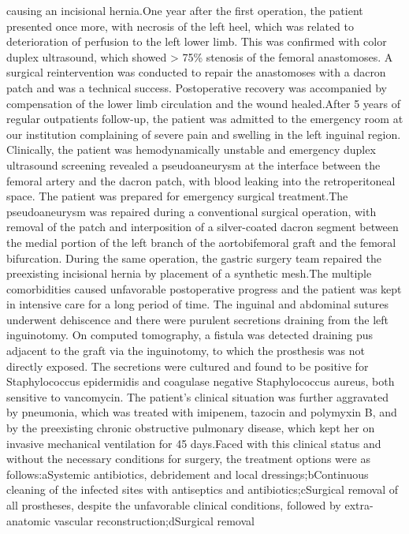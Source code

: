 \documentclass[numberinsection,times,10pt,spreadimages]{memoir}
\begin{document}
causing an incisional hernia.One year after the first operation, the patient
presented once more, with
necrosis of the left heel, which was related to deterioration of perfusion to
the left lower limb. This was confirmed with color duplex ultrasound, which
showed > 75\% stenosis of the femoral anastomoses. A surgical reintervention
was conducted to repair the anastomoses with a dacron patch and was a technical
success. Postoperative recovery was accompanied by compensation of the lower
limb circulation and the wound healed.After 5 years of regular outpatients
follow-up, the patient was admitted to the
emergency room at our institution complaining of severe pain and swelling in the
left inguinal region. Clinically, the patient was hemodynamically unstable and
emergency duplex ultrasound screening revealed a pseudoaneurysm at the interface
between the femoral artery and the dacron patch, with blood leaking into the
retroperitoneal space. The patient was prepared for emergency surgical
treatment.The pseudoaneurysm was repaired during a conventional surgical
operation, with
removal of the patch and interposition of a silver-coated dacron segment between
the medial portion of the left branch of the aortobifemoral graft and the
femoral bifurcation. During the same operation, the gastric surgery team
repaired the preexisting incisional hernia by placement of a synthetic mesh.The
multiple comorbidities caused unfavorable postoperative progress and the
patient was kept in intensive care for a long period of time. The inguinal and
abdominal sutures underwent dehiscence and there were purulent secretions
draining from the left inguinotomy. On computed tomography, a fistula was
detected draining pus adjacent to the graft via the inguinotomy, to which the
prosthesis was not directly exposed. The secretions were cultured and found to
be positive for Staphylococcus epidermidis and coagulase
negative Staphylococcus aureus, both sensitive to vancomycin.
The patient’s clinical situation was further aggravated by pneumonia, which was
treated with imipenem, tazocin and polymyxin B, and by the preexisting chronic
obstructive pulmonary disease, which kept her on invasive mechanical ventilation
for 45 days.Faced with this clinical status and without the necessary conditions
for surgery,
the treatment options were as follows:aSystemic antibiotics, debridement and
local dressings;bContinuous cleaning of the infected sites with antiseptics and
antibiotics;cSurgical removal of all prostheses, despite the unfavorable
clinical
conditions, followed by extra-anatomic vascular reconstruction;dSurgical removal
\end{document}
